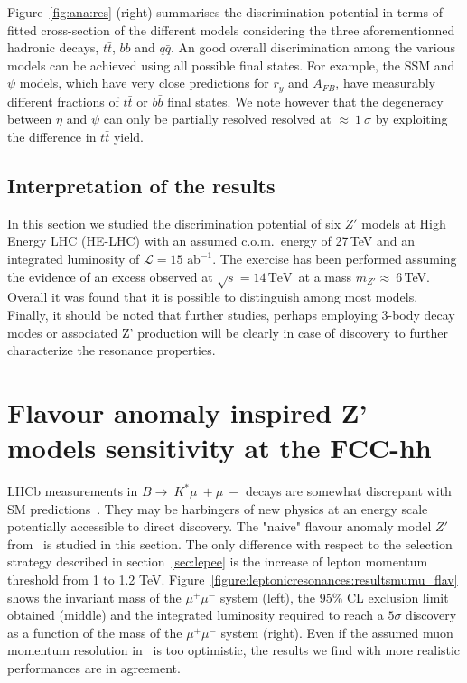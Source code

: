 \documentclass[a4paper,11pt]{article}
\newcommand*{\intlumihelhc}{\ensuremath{\mathcal{L}=15\,\text{ab}^{-1}}}
\newcommand*{\com}{c.o.m.~}
\newcommand*{\sqrtslhc}{\ensuremath{\sqrt{s}=14\,\text{TeV}}}
\renewcommand*{\intlumihelhc}{\ensuremath{\mathcal{L}=15\text{ ab}^{-1}}}
\begin{document}
Figure~\ref{fig:ana:res} (right) summarises the discrimination potential in terms of fitted cross-section of the different models considering the three aforementionned hadronic decays, $t\bar{t}$,  $b\bar{b}$ and $q\bar{q}$. An good overall discrimination among the various models can be achieved using all possible final states. For example, the SSM and $\psi$ models, which have very close predictions for $r_y$ and $A_{FB}$, have measurably different fractions of $t\bar{t}$ or $b\bar{b}$ final states. We note however that the degeneracy between $\eta$ and $\psi$ can only be partially resolved resolved at $\approx~1~\sigma$ by exploiting the difference in $t\bar{t}$ yield.

\subsection{Interpretation of the results}
In this section we studied the discrimination potential of six $Z'$ models at High Energy LHC (HE-LHC) with an assumed \com energy of 27\,TeV and an integrated luminosity of \intlumihelhc. The exercise has been performed assuming the evidence of an excess observed at \sqrtslhc\ at a mass $m_{Z'}\approx~6$\,TeV. Overall it was found that it is possible to distinguish among most models. Finally, it should be noted that further studies, perhaps employing 3-body decay modes or associated Z' production will be clearly in case of discovery to further characterize the resonance properties.


\section{Flavour anomaly inspired Z' models sensitivity at the FCC-hh}
\label{sec:zprimeflav}
LHCb measurements in $B\rightarrow~K^*\mu~+\mu~-$ decays are somewhat discrepant with SM predictions~\cite{Aaij:2014ora,Aaij:2017vbb}. They may be harbingers of new physics at an energy scale potentially accessible to direct discovery. The "naive" flavour anomaly model $Z'$ from~\cite{Allanach:2017bta} is studied in this section. The only difference with respect to the selection strategy described in section~\ref{sec:lepee} is the increase of lepton momentum threshold from 1 to 1.2 TeV. Figure~\ref{figure:leptonicresonances:resultsmumu_flav} shows the invariant mass of the $\mu^+\mu^-$ system (left), the 95\% CL exclusion limit obtained (middle) and the integrated luminosity required to reach a $5\sigma$ discovery as a function of the mass of the $\mu^+\mu^-$ system (right). Even if the assumed muon momentum resolution in~\cite{Allanach:2017bta} is too optimistic, the results we find with more realistic performances are in agreement.
\end{document}
